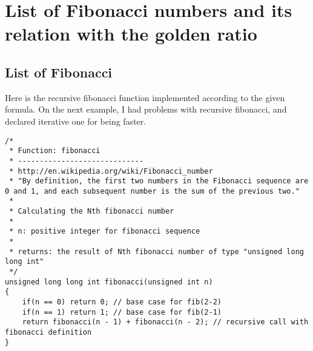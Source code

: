 \documentclass{article}
\begin{document}
\section{List of Fibonacci numbers and its relation with the golden ratio}

	\subsection{List of Fibonacci}
	Here is the recursive fibonacci function implemented according to the given formula. On the next example, I had problems with recursive fibonacci, and declared iterative one for being faster.
		\begin{lstlisting}[label=recursive-fibonacci,caption=Fibonacci]	
/*
 * Function: fibonacci
 * -----------------------------
 * http://en.wikipedia.org/wiki/Fibonacci_number
 * "By definition, the first two numbers in the Fibonacci sequence are 0 and 1, and each subsequent number is the sum of the previous two."
 * 
 * Calculating the Nth fibonacci number
 *
 * n: positive integer for fibonacci sequence
 *
 * returns: the result of Nth fibonacci number of type "unsigned long long int"
 */
unsigned long long int fibonacci(unsigned int n)
{
    if(n == 0) return 0; // base case for fib(2-2)
    if(n == 1) return 1; // base case for fib(2-1)
    return fibonacci(n - 1) + fibonacci(n - 2); // recursive call with fibonacci definition
}
		\end{lstlisting}
		
\end{document}
